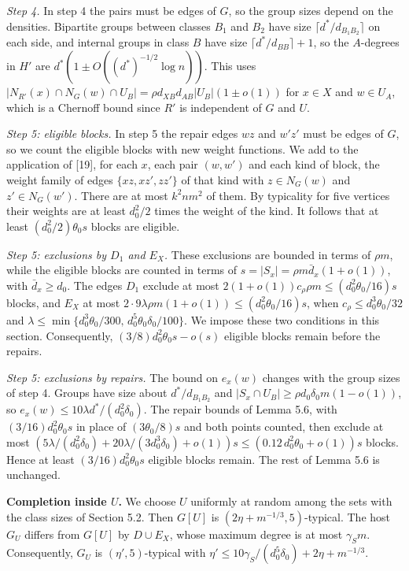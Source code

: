 \documentclass[english,11pt,a4paper]{article}
\begin{document}
\emph{Step 4.} In step 4 the pairs must be edges of \(G\), so the group sizes depend on the densities. Bipartite groups between classes \(B_1\) and \(B_2\) have size \(\lceil d^*/d_{B_1B_2}\rceil\) on each side, and internal groups in class \(B\) have size \(\lceil d^*/d_{BB}\rceil+1\), so the \(A\)-degrees in \(H'\) are \(d^*(1\pm O((d^*)^{-1/2}\log n))\). This uses \(|N_{R'}(x)\cap N_G(w)\cap U_B|=\rho d_{XB}d_{AB}|U_B|(1\pm o(1))\) for \(x\in X\) and \(w\in U_A\), which is a Chernoff bound since \(R'\) is independent of \(G\) and \(U\).

\emph{Step 5: eligible blocks.} In step 5 the repair edges \(wz\) and \(w'z'\) must be edges of \(G\), so we count the eligible blocks with new weight functions. We add to the application of {[}19{]}, for each \(x\), each pair \((w,w')\) and each kind of block, the weight family of edges \(\{xz,xz',zz'\}\) of that kind with \(z\in N_G(w)\) and \(z'\in N_G(w')\). There are at most \(k^2nm^2\) of them. By typicality for five vertices their weights are at least \(d_0^2/2\) times the weight of the kind. It follows that at least \((d_0^2/2)\theta_0s\) blocks are eligible.

\emph{Step 5: exclusions by \(D_1\) and \(E_X\).} These exclusions are bounded in terms of \(\rho m\), while the eligible blocks are counted in terms of \(s=|S_x|=\rho m\bar d_x(1+o(1))\), with \(\bar d_x\ge d_0\). The edges \(D_1\) exclude at most \(2(1+o(1))c_\rho\rho m\le(d_0^2\theta_0/16)s\) blocks, and \(E_X\) at most \(2\cdot9\lambda\rho m(1+o(1))\le(d_0^2\theta_0/16)s\), when \(c_\rho\le d_0^3\theta_0/32\) and \(\lambda\le\min\{d_0^3\theta_0/300,\,d_0^5\theta_0\delta_0/100\}\). We impose these two conditions in this section. Consequently, \((3/8)d_0^2\theta_0s-o(s)\) eligible blocks remain before the repairs.

\emph{Step 5: exclusions by repairs.} The bound on \(e_x(w)\) changes with the group sizes of step 4. Groups have size about \(d^*/d_{B_1B_2}\) and \(|S_x\cap U_B|\ge\rho d_0\delta_0m(1-o(1))\), so \(e_x(w)\le10\lambda d^*/(d_0^2\delta_0)\). The repair bounds of Lemma 5.6, with \((3/16)d_0^2\theta_0s\) in place of \((3\theta_0/8)s\) and both points counted, then exclude at most \((5\lambda/(d_0^2\delta_0)+20\lambda/(3d_0^3\delta_0)+o(1))s\le(0.12\,d_0^2\theta_0+o(1))s\) blocks. Hence at least \((3/16)d_0^2\theta_0s\) eligible blocks remain. The rest of Lemma 5.6 is unchanged.

\textbf{Completion inside \(U\).} We choose \(U\) uniformly at random among the sets with the class sizes of Section 5.2. Then \(G[U]\) is \((2\eta+m^{-1/3},5)\)-typical. The host \(G_U\) differs from \(G[U]\) by \(D\cup E_X\), whose maximum degree is at most \(\gamma_Sm\). Consequently, \(G_U\) is \((\eta',5)\)-typical with \(\eta'\le10\gamma_S/(d_0^5\delta_0)+2\eta+m^{-1/3}\).
\end{document}
